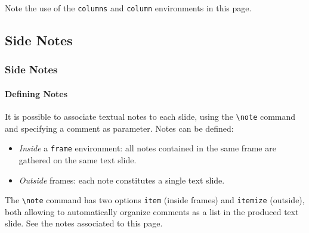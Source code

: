 \documentclass[10pt,    %
    english,            %
    xcolor=table,       %
    envcountsect,       %
    aspectratio=43      %
]{beamer}
\begin{document}
\begin{frame}
    
    \vspace{0.25cm}
    Note the use of the \texttt{columns} and \texttt{column} environments in this page.
\end{frame}



\subsection{Side Notes}
\begin{frame}
    \frametitle{Side Notes}
    \framesubtitle{Defining Notes}
    
    It is possible to associate textual notes to each slide, using the \texttt{\textbackslash{}note} command and specifying a comment as parameter. Notes can be defined:
    \begin{itemize}
        \item \textit{Inside} a \texttt{frame} environment: all notes contained in the same frame are gathered on the same text slide.
        \item \textit{Outside} frames: each note constitutes a single text slide.
    \end{itemize}
    
    \vspace{0.25cm}
    The \texttt{\textbackslash{}note} command has two options \texttt{item} (inside frames) and \texttt{itemize} (outside), both allowing to automatically organize comments as a list in the produced text slide. See the notes associated to this page.
\end{frame}
\end{document}
